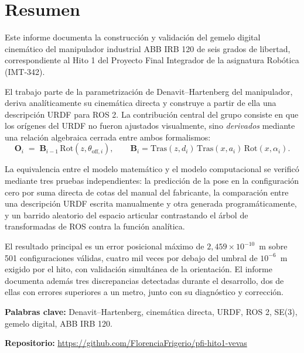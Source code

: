 \documentclass[11pt,a4paper]{article}
\newcommand{\mat}[1]{\mathbf{#1}}
\begin{document}
\section*{Resumen}

Este informe documenta la construcción y validación del gemelo digital
cinemático del manipulador industrial ABB IRB 120 de seis grados de
libertad, correspondiente al Hito 1 del Proyecto Final Integrador de la
asignatura Robótica (IMT-342).

El trabajo parte de la parametrización de Denavit--Hartenberg del
manipulador, deriva analíticamente su cinemática directa y construye a
partir de ella una descripción URDF para ROS 2. La contribución central
del grupo consiste en que los orígenes del URDF no fueron ajustados
visualmente, sino \emph{derivados} mediante una relación algebraica
cerrada entre ambos formalismos:
\[
\mat{O}_i \;=\; \mat{B}_{i-1}\,\mathrm{Rot}(z,\theta_{\mathrm{off},i}),
\qquad
\mat{B}_i = \mathrm{Tras}(z,d_i)\,\mathrm{Tras}(x,a_i)\,\mathrm{Rot}(x,\alpha_i).
\]

La equivalencia entre el modelo matemático y el modelo computacional se
verificó mediante tres pruebas independientes: la predicción de la pose
en la configuración cero por suma directa de cotas del manual del
fabricante, la comparación entre una descripción URDF escrita
manualmente y otra generada programáticamente, y un barrido aleatorio
del espacio articular contrastando el árbol de transformadas de ROS
contra la función analítica.

El resultado principal es un error posicional máximo de
$2{,}459\times10^{-10}$~m sobre 501 configuraciones válidas, cuatro mil
veces por debajo del umbral de $10^{-6}$~m exigido por el hito, con
validación simultánea de la orientación. El informe documenta además
tres discrepancias detectadas durante el desarrollo, dos de ellas con
errores superiores a un metro, junto con su diagnóstico y corrección.

\vspace{6pt}
\noindent\textbf{Palabras clave:} Denavit--Hartenberg, cinemática
directa, URDF, ROS 2, SE(3), gemelo digital, ABB IRB 120.

\vspace{10pt}
\noindent\textbf{Repositorio:}
\url{https://github.com/FlorenciaFrigerio/pfi-hito1-vevas}

\newpage
\tableofcontents
\newpage
\end{document}
